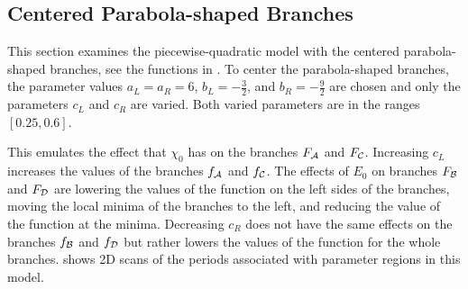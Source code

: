 \subsection{Centered Parabola-shaped Branches}
\label{sec:setup.quad.even}

This section examines the piecewise-quadratic model with the centered parabola-shaped branches, see the functions in .
To center the parabola-shaped branches, the parameter values $a_L = a_R = 6$, $b_L = -\frac{3}{2}$, and $b_R = -\frac{9}{2}$ are chosen and only the parameters $c_L$ and $c_R$ are varied.
Both varied parameters are in the ranges $[0.25, 0.6]$.


This emulates the effect that $\chi_0$ has on the branches $F_{\mathcal{A}}$ and $F_{\mathcal{C}}$.
Increasing $c_L$ increases the values of the branches $f_{\mathcal{A}}$ and $f_{\mathcal{C}}$.
The effects of $E_0$ on branches $F_{\mathcal{B}}$ and $F_{\mathcal{D}}$ are lowering the values of the function on the left sides of the branches, moving the local minima of the branches to the left, and reducing the value of the function at the minima.
Decreasing $c_R$ does not have the same effects on the branches $f_{\mathcal{B}}$ and $f_{\mathcal{D}}$ but rather lowers the values of the function for the whole branches.
 shows 2D scans of the periods associated with parameter regions in this model.

